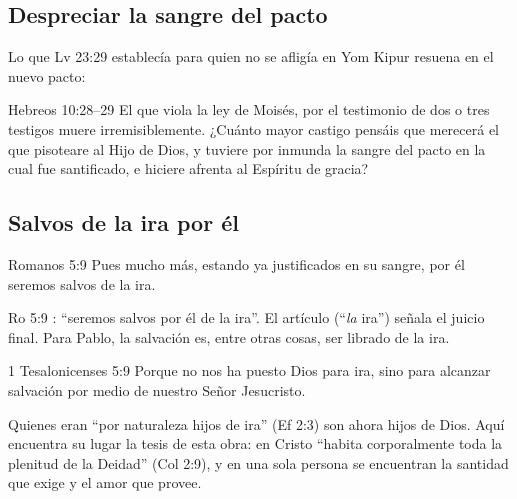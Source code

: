 \subsection{Despreciar la sangre del pacto}
Lo que Lv 23:29 establecía para quien no se afligía en Yom Kipur resuena en el nuevo pacto:

\begin{verso}{Hebreos 10:28–29}
El que viola la ley de Moisés, por el testimonio de dos o tres testigos muere irremisiblemente. ¿Cuánto mayor castigo pensáis que merecerá el que pisoteare al Hijo de Dios, y tuviere por inmunda la sangre del pacto en la cual fue santificado, e hiciere afrenta al Espíritu de gracia?
\end{verso}


\subsection{Salvos de la ira por él}
\begin{verso}{Romanos 5:9}
Pues mucho más, estando ya justificados en su sangre, por él seremos salvos de la ira.
\end{verso}

\begin{filologiatexto}{Ro 5:9}
: ``seremos salvos por él de la ira''. El artículo (``\emph{la} ira'') señala el juicio final. Para Pablo, la salvación es, entre otras cosas, ser librado de la ira.
\end{filologiatexto}

\begin{verso}{1 Tesalonicenses 5:9}
Porque no nos ha puesto Dios para ira, sino para alcanzar salvación por medio de nuestro Señor Jesucristo.
\end{verso}

Quienes eran ``por naturaleza hijos de ira'' (Ef 2:3) son ahora hijos de Dios. Aquí encuentra su lugar la tesis de esta obra: en Cristo ``habita corporalmente toda la plenitud de la Deidad'' (Col 2:9), y en una sola persona se encuentran la santidad que exige y el amor que provee.

